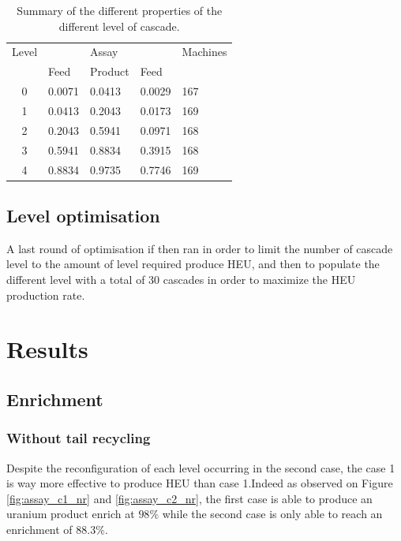 \documentclass{anstrans}
\begin{document}
\begin{table}[htb]
\centering
\begin{tabular}{cllll}
\toprule

Level   &           & Assay     &       & Machines  \\ 
        & Feed      & Product   & Feed  &           \\
\midrule
0       & 0.0071    & 0.0413    & 0.0029 & 167       \\
1       & 0.0413    & 0.2043    & 0.0173 & 169       \\
2       & 0.2043    & 0.5941    & 0.0971 & 168       \\
3       & 0.5941    & 0.8834    & 0.3915 & 168       \\
4       & 0.8834    & 0.9735    & 0.7746 & 169       \\

\bottomrule
\end{tabular}
  \caption{Summary of the different properties of the different level of cascade.}
  \label{tab:cascadelvl}
\end{table}


\subsection{Level optimisation}
A last round of optimisation if then ran in order to limit the number of cascade
level to the amount of level required produce HEU, and then to populate the
different level with a total of 30 cascades in order to maximize the HEU
production rate.

\section{Results}
\subsection{Enrichment}
\subsubsection{Without tail recycling}
Despite the reconfiguration of each level occurring in the second case, the case
1 is way more effective to produce HEU than case 1.Indeed as observed on Figure
\ref{fig:assay_c1_nr} and \ref{fig:assay_c2_nr}, the first case is able to
produce an uranium product enrich at $98\%$ while the second case is only able
to reach an enrichment of $88.3\%$.
\end{document}
